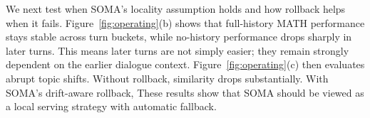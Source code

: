 We next test when SOMA's locality assumption holds and how rollback helps when it fails. Figure~\ref{fig:operating}(b) shows that full-history MATH performance stays stable across turn buckets, while no-history performance drops sharply in later turns. This means later turns are not simply easier; they remain strongly dependent on the earlier dialogue context. Figure~\ref{fig:operating}(c) then evaluates abrupt topic shifts. Without rollback, similarity drops substantially. With SOMA's drift-aware rollback,  These results show that SOMA should be viewed as a local serving strategy with automatic fallback. 

